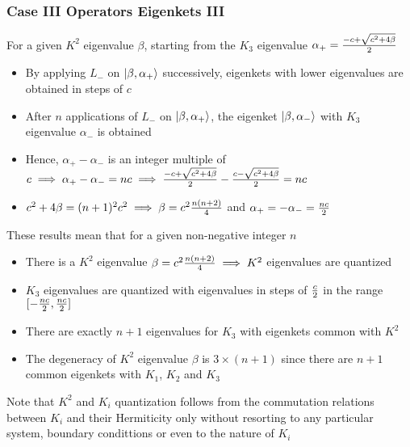 \documentclass[8pt,t,mathserif,aspectratio=169]{beamer}
\begin{document}
\begin{frame}
  \frametitle{Case III Operators Eigenkets III}
  \vspace{1mm}
  For a given $K^2$ eigenvalue $\beta$, starting from the $K_3$ eigenvalue $\alpha_{+} = {-c + \sqrt{c^2 + 4 \beta} \over 2}$
  \begin{itemize}
    \item By applying $L_{-}$ on $\ket{\beta,\alpha_{+}}$ successively, eigenkets with lower eigenvalues are obtained in steps of $c$
    \item After $n$ applications of $L_{-}$ on $\ket{\beta,\alpha_{+}}$, the eigenket $\ket{\beta,\alpha_{-}}$ with $K_3$ eigenvalue $\alpha_{-}$ is obtained
    \item Hence, $\alpha_{+} - \alpha_{-}$ is an integer multiple of $c \implies \alpha_{+} - \alpha_{-} = nc \implies {-c + \sqrt{c^2 + 4 \beta} \over 2} - {c - \sqrt{c^2 + 4 \beta} \over 2} = nc$
    \item $c^2 + 4 \beta = (n + 1)^2 c^2 \implies \beta = c^2 {n(n + 2) \over 4}$ and $\alpha_{+} = -\alpha_{-} = {nc \over 2}$
  \end{itemize}
  These results mean that for a given non-negative integer $n$
  \begin{itemize}
    \item There is a $K^2$ eigenvalue $\beta = c^2 {n(n + 2) \over 4} \implies K^2$ eigenvalues are quantized
    \item $K_3$ eigenvalues are quantized with eigenvalues in steps of $c \over 2$ in the range $[-{nc\over 2},{nc \over 2}]$
    \item There are exactly $n + 1$ eigenvalues for $K_3$ with eigenkets common with $K^2$
    \item The degeneracy of $K^2$ eigenvalue $\beta$ is $3 \times (n + 1)$ since there are $n + 1$ common eigenkets with $K_1$, $K_2$ and $K_3$
  \end{itemize}
  Note that $K^2$ and $K_i$ quantization follows from the commutation relations between $K_i$ and their Hermiticity only without resorting to any particular system, boundary condittions or even to the nature of $K_i$
\end{frame}
\end{document}
